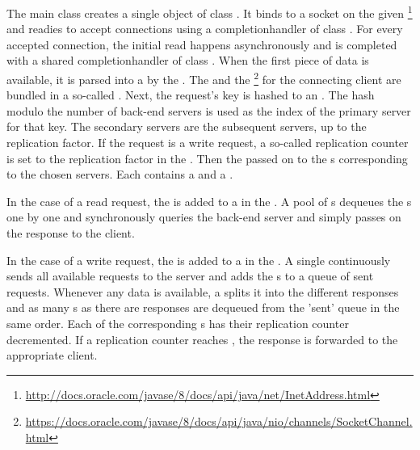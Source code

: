 \documentclass[11pt]{article}
\begin{document}
The main class  creates a single object of class .
It binds to a socket on the given \footnote{\tiny\url{http://docs.oracle.com/javase/8/docs/api/java/net/InetAddress.html}} and readies to accept connections using a completionhandler of class .
For every accepted connection, the initial read happens asynchronously and is completed with a shared completionhandler of class .
When the first piece of data is available, it is parsed into a  by the .
The  and the \footnote{\tiny\url{https://docs.oracle.com/javase/8/docs/api/java/nio/channels/SocketChannel.html}} for the connecting client are bundled in a so-called .
Next, the request's key is hashed to an .
The hash modulo the number of back-end servers is used as the index of the primary server for that key.
The secondary servers are the subsequent servers, up to the replication factor.
If the request is a write request, a so-called replication counter is set to the replication factor in the .
Then the  passed on to the s corresponding to the chosen servers.
Each  contains a  and a .

In the case of a read request, the  is added to a  in the .
A pool of s dequeues the s one by one and synchronously queries the back-end server and simply passes on the response to the client.

In the case of a write request, the  is added to a  in the .
A single  continuously sends all available requests to the server and adds the s to a queue of sent requests.
Whenever any data is available, a  splits it into the different responses and as many s as there are responses are dequeued from the 'sent' queue in the same order.
Each of the corresponding s has their replication counter decremented.
If a replication counter reaches , the response is forwarded to the appropriate client.
\end{document}
